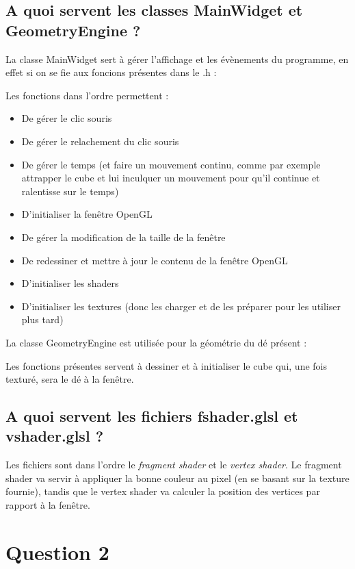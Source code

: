 \documentclass[a4paper,11pt]{report}
\begin{document}
    \subsection{A quoi servent les classes MainWidget et GeometryEngine ?}
    La classe MainWidget sert à gérer l'affichage et les évènements du programme, en effet si on se fie aux foncions présentes dans le .h :
    
    Les fonctions dans l'ordre permettent :
    \begin{itemize}
    	\item De gérer le clic souris
    	\item De gérer le relachement du clic souris
    	\item De gérer le temps (et faire un mouvement continu, comme par exemple attrapper le cube et lui inculquer un mouvement pour qu'il continue et ralentisse sur le temps)
    	\item D'initialiser la fenêtre OpenGL
    	\item De gérer la modification de la taille de la fenêtre
    	\item De redessiner et mettre à jour le contenu de la fenêtre OpenGL
    	\item D'initialiser les shaders
    	\item D'initialiser les textures (donc les charger et de les préparer pour les utiliser plus tard)
    \end{itemize}   
    \hfill \break
	La classe GeometryEngine est utilisée pour la géométrie du dé présent :
    
    Les fonctions présentes servent à dessiner et à initialiser le cube qui, une fois texturé, sera le dé à la fenêtre.

    \pagebreak
    \subsection{A quoi servent les fichiers fshader.glsl et vshader.glsl ?}
    Les fichiers sont dans l'ordre le {\it{fragment shader}} et le {\it{vertex shader}}. Le fragment shader va servir à appliquer la bonne couleur au pixel (en se basant sur la texture fournie), tandis que le vertex shader va calculer la position des vertices par rapport à la fenêtre.
	
	\pagebreak
	\section{Question 2}
\end{document}
